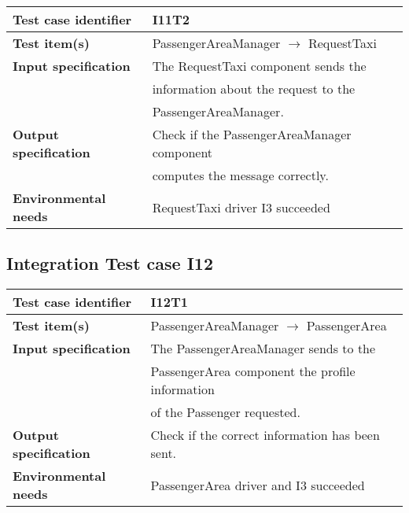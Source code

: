 		\noindent
		\begin{adjustbox}{max width=\textwidth}
			\begin{tabular}{ l l}
				\hline 		\textbf{Test case identifier} & I11T2 \\
				\hline		\textbf{Test item(s)}  & PassengerAreaManager $\rightarrow$ RequestTaxi \\
				\hline		\textbf{Input specification} & The RequestTaxi component sends the\\& information about the request to the\\& PassengerAreaManager.\\
				\hline		\textbf{Output specification} & Check if the PassengerAreaManager component\\& computes the  message correctly.\\
				\hline		\textbf{Environmental needs} & RequestTaxi driver I3 succeeded\\
				\hline
			\end{tabular}
		\end{adjustbox}
	
	\hypertarget{chapter 3.12}{ }
	\subsection{Integration Test case I12}
		\begin{adjustbox}{max width=\textwidth}
			\begin{tabular}{ l l}
				\hline 		\textbf{Test case identifier} & I12T1 \\
				\hline		\textbf{Test item(s)}  & PassengerAreaManager $\rightarrow$ PassengerArea \\
				\hline		\textbf{Input specification} & The PassengerAreaManager sends to the\\ &  PassengerArea component the profile information\\ &  of the Passenger requested.\\
				\hline		\textbf{Output specification} & Check if the correct information has been sent.\\
				\hline		\textbf{Environmental needs} & PassengerArea driver and I3 succeeded\\
				\hline
			\end{tabular}
		\end{adjustbox}
		
